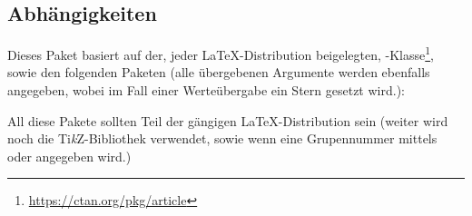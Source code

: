 \documentclass{sopra-base}
\begin{document}
\subsection{Abhängigkeiten}
    Dieses Paket basiert auf der, jeder \LaTeX-Distribution beigelegten, 
    -Klasse\footnote{\url{https://ctan.org/pkg/article}},
    sowie den folgenden Paketen (alle übergebenen Argumente werden ebenfalls 
    angegeben, wobei im Fall einer Werteübergabe ein Stern gesetzt wird.):
    \begin{multicols}{3}
    \end{multicols}
    All diese Pakete sollten Teil der gängigen \LaTeX-Distribution sein (weiter
    wird noch die Ti\textit{k}Z-Bibliothek  verwendet, sowie 
    wenn eine Grupennummer mittels  oder 
    angegeben wird.)
\end{document}
